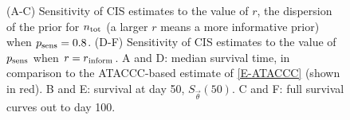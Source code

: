 \documentclass[thesis.tex]{subfiles}
\begin{document}
\begin{figure}
  \caption[Sensitivity of CIS estimates to the prior.]{%
    (A-C) Sensitivity of CIS estimates to the value of $r$, the dispersion of the prior for $n_\text{tot}$ (a larger $r$ means a more informative prior) when $p_\text{sens} = 0.8$.
    (D-F) Sensitivity of CIS estimates to the value of $p_\text{sens}$ when $r = r{_{\text{inform}}}$.
    A and D: median survival time, in comparison to the ATACCC-based estimate of \cref{E-ATACCC} (shown in red).
    B and E: survival at day 50, $S_{\vec{\theta}}(50)$.
    C and F: full survival curves out to day 100.
  }
  \label{imperf-test:fig:cis-sensitivity}
\end{figure}
\end{document}
